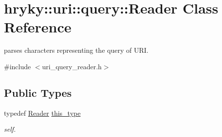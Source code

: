 \hypertarget{classhryky_1_1uri_1_1query_1_1_reader}{\section{hryky\-:\-:uri\-:\-:query\-:\-:Reader Class Reference}
\label{classhryky_1_1uri_1_1query_1_1_reader}
}


parses characters representing the query of U\-R\-I.  




{\ttfamily \#include $<$uri\-\_\-query\-\_\-reader.\-h$>$}

\subsection*{Public Types}
\begin{DoxyCompactItemize}
\item 
\hypertarget{classhryky_1_1uri_1_1query_1_1_reader_a97e540246025546fe1c7f4570b3f7240}{typedef \hyperlink{classhryky_1_1uri_1_1query_1_1_reader}{Reader} \hyperlink{classhryky_1_1uri_1_1query_1_1_reader_a97e540246025546fe1c7f4570b3f7240}{this\-\_\-type}}\label{classhryky_1_1uri_1_1query_1_1_reader_a97e540246025546fe1c7f4570b3f7240}

\begin{DoxyCompactList}\small\item\em self. \end{DoxyCompactList}\end{DoxyCompactItemize}
